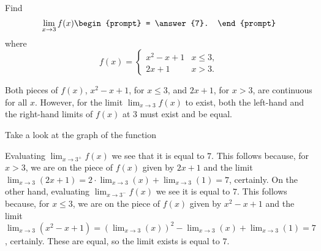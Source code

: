 \documentclass{ximera}
\author{Gregory Hartman \and Matthew Carr}
\begin{document}
\begin{exercise}



 Find 
  \[
  \lim_{x\to 3} f(x)
  \begin{prompt}
  = \answer{7}.
  \end{prompt}
  \]
  where
  \[
  f(x) = \left\{\begin{array}{cl} x^2-x+1 & x\leq 3, \\ 2x+1 & x>3. \end{array}\right.
  \]
    \begin{hint}
     Both pieces of $f(x)$, $x^2-x+1$, for $x\leq3$, and $2x+1$, for $x>3$, are continuous for all $x$. However, for the limit $\lim_{x\to3}f(x)$ to exist, both the left-hand and the right-hand limits of $f(x)$ at $3$ must exist and be equal.
    \end{hint}
     \begin{hint}
    	Take a look at the graph of the function
    \begin{center}
      \end{center} 
    \end{hint}
    \begin{hint}
     Evaluating $\lim_{x\to3^{+}}f(x)$ we see that it is equal to $7$. This follows because, for $x>3$, we are on the piece of $f(x)$ given by $2x+1$ and the limit $\lim_{x\to3}\left({2x+1}\right)=2\cdot\lim_{x\to 3}(x)+\lim_{x\to3}\left({1}\right)=7$, certainly. On the other hand, evaluating $\lim_{x\to3^{-}}f(x)$ we see it is equal to $7$. This follows because, for $x\leq3$, we are on the piece of $f(x)$ given by $x^2-x+1$ and the limit $\lim_{x\to3}\left({x^2-x+1}\right)=\left({\lim_{x\to3}(x)}\right)^2-\lim_{x\to 3}(x)+\lim_{x\to3}\left({1}\right)=7$, certainly. These are equal, so the limit exists is equal to $7$.
    \end{hint}
\end{exercise}
\end{document}
